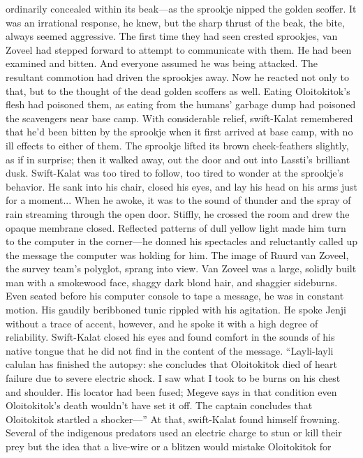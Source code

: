 \documentclass[9pt]{article}
\begin{document}
ordinarily concealed within its beak—as the sprookje nipped the golden scoffer.
It was an irrational response, he knew, but the sharp thrust of the beak, the bite, always seemed
aggressive. The first time they had seen crested sprookjes, van Zoveel had stepped forward to attempt to
communicate with them. He had been examined and bitten. And everyone assumed he was being
attacked. The resultant commotion had driven the sprookjes away.
Now he reacted not only to that, but to the thought of the dead golden scoffers as well. Eating
Oloitokitok’s flesh had poisoned them, as eating from the humans’ garbage dump had poisoned the
scavengers near base camp. With considerable relief, swift-Kalat remembered that he’d been bitten by
the sprookje when it first arrived at base camp, with no ill effects to either of them.
The sprookje lifted its brown cheek-feathers slightly, as if in surprise; then it walked away, out the
door and out into Lassti’s brilliant dusk. Swift-Kalat was too tired to follow, too tired to wonder at the
sprookje’s behavior. He sank into his chair, closed his eyes, and lay his head on his arms just for a
moment...
When he awoke, it was to the sound of thunder and the spray of rain streaming through the open
door. Stiffly, he crossed the room and drew the opaque membrane closed. Reflected patterns of dull
yellow light made him turn to the computer in the corner—he donned his spectacles and reluctantly called
up the message the computer was holding for him.
The image of Ruurd van Zoveel, the survey team’s polyglot, sprang into view. Van Zoveel was a
large, solidly built man with a smokewood face, shaggy dark blond hair, and shaggier sideburns. Even
seated before his computer console to tape a message, he was in constant motion. His gaudily
beribboned tunic rippled with his agitation.
He spoke Jenji without a trace of accent, however, and he spoke it with a high degree of reliability.
Swift-Kalat closed his eyes and found comfort in the sounds of his native tongue that he did not find in
the content of the message.
“Layli-layli calulan has finished the autopsy: she concludes that Oloitokitok died of heart failure due
to severe electric shock. I saw what I took to be burns on his chest and shoulder. His locator had been
fused; Megeve says in that condition even Oloitokitok’s death wouldn’t have set it off. The captain
concludes that Oloitokitok startled a shocker—”
At that, swift-Kalat found himself frowning. Several of the indigenous predators used an electric
charge to stun or kill their prey but the idea that a live-wire or a blitzen would mistake Oloitokitok for
\end{document}
